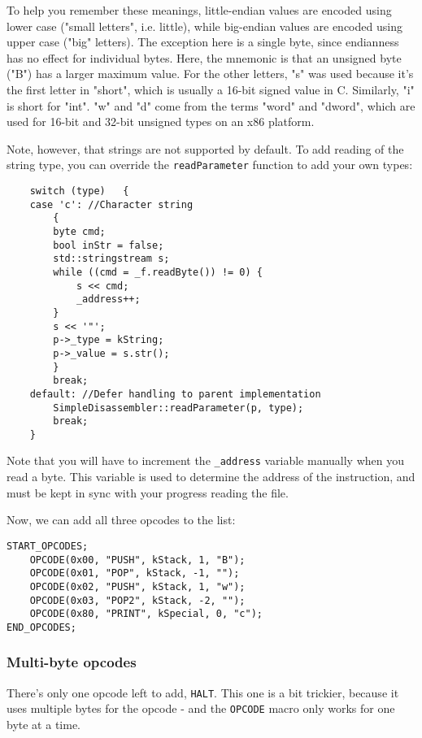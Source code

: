 To help you remember these meanings, little-endian values are encoded using lower case ("small letters", i.e. little), while big-endian values are encoded using upper case ("big" letters). The exception here is a single byte, since endianness has no effect for individual bytes. Here, the mnemonic is that an unsigned byte ("B") has a larger maximum value. For the other letters, "s" was used because it's the first letter in "short", which is usually a 16-bit signed value in C. Similarly, "i" is short for "int". "w" and "d" come from the terms "word" and "dword", which are used for 16-bit and 32-bit unsigned types on an x86 platform.

Note, however, that strings are not supported by default. To add reading of the string type, you can override the \verb+readParameter+ function to add your own types:

\begin{C++}
\begin{lstlisting}
	switch (type)	{
	case 'c': //Character string
		{
		byte cmd;
		bool inStr = false;
		std::stringstream s;
		while ((cmd = _f.readByte()) != 0) {
			s << cmd;
			_address++;
		}
		s << '"';
		p->_type = kString;
		p->_value = s.str();
		}
		break;
	default: //Defer handling to parent implementation
		SimpleDisassembler::readParameter(p, type);
		break;
	}
\end{lstlisting}
\end{C++}

Note that you will have to increment the \verb+_address+ variable manually when you read a byte. This variable is used to determine the address of the instruction, and must be kept in sync with your progress reading the file.

Now, we can add all three opcodes to the list:

\begin{C++}
\begin{lstlisting}
START_OPCODES;
	OPCODE(0x00, "PUSH", kStack, 1, "B");
	OPCODE(0x01, "POP", kStack, -1, "");
	OPCODE(0x02, "PUSH", kStack, 1, "w");
	OPCODE(0x03, "POP2", kStack, -2, "");
	OPCODE(0x80, "PRINT", kSpecial, 0, "c");
END_OPCODES;
\end{lstlisting}
\end{C++}

\subsubsection{Multi-byte opcodes}
There's only one opcode left to add, \verb+HALT+. This one is a bit trickier, because it uses multiple bytes for the opcode - and the \verb+OPCODE+ macro only works for one byte at a time.

